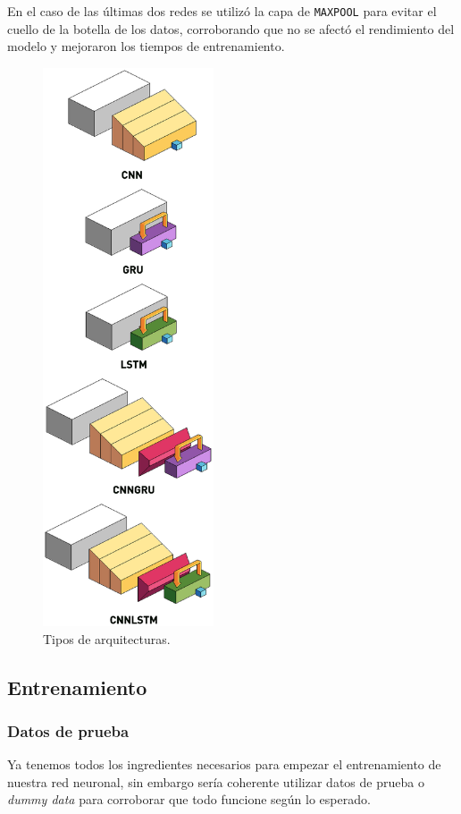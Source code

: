 \documentclass[a4paper,12pt]{article}
\begin{document}
En el caso de las últimas dos redes se utilizó la capa de \texttt{MAXPOOL} para evitar el cuello de la botella de los datos, corroborando que no se afectó el rendimiento del modelo y mejoraron los tiempos de entrenamiento.

\begin{figure}[H]
	\begin{center}
	\includegraphics[width=0.45\textwidth]{layers.eps}
  	\caption{Tipos de arquitecturas.}
  	\label{fig:arch_types}
  	\end{center}
\end{figure}

\subsection{Entrenamiento}
\subsubsection{Datos de prueba}
Ya tenemos todos los ingredientes necesarios para empezar el entrenamiento de nuestra red neuronal, sin embargo sería coherente utilizar datos de prueba o \textit{dummy data} para corroborar que todo funcione según lo esperado.
\end{document}
